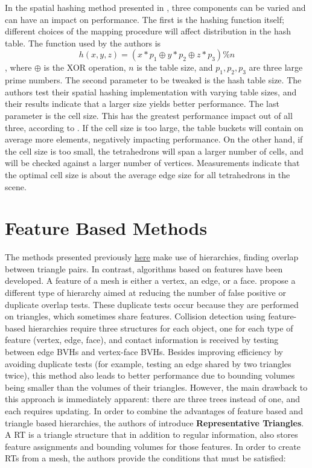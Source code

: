 
In the spatial hashing method presented in \citep{thm03}, three components can be varied and can have an impact on performance. The first is the hashing function itself; different choices of the mapping procedure will affect distribution in the hash table. The function used by the authors is \[h(x, y, z) = (x * p_{1} \oplus y * p_{2} \oplus  z * p_{3}) \% n \], where $\oplus$ is the XOR operation, $n$ is the table size, and $p_{1}, p_{2}, p_{3}$ are three large prime numbers. The second parameter to be tweaked is the hash table size. The authors test their spatial hashing implementation with varying table sizes, and their results indicate that a larger size yields better performance. The last parameter is the cell size. This has the greatest performance impact out of all three, according to \citep{thm03}. If the cell size is too large, the table buckets will contain on average more elements, negatively impacting performance. On the other hand, if the cell size is too small, the tetrahedrons will span a larger number of cells, and will be checked against a larger number of vertices. Measurements indicate that the optimal cell size is about the average edge size for all tetrahedrons in the scene.


\FloatBarrier
\section{Feature Based Methods}
\label{sec:feature}

The methods presented previously \hyperref[sec:bvh]{here} make use of hierarchies, finding overlap between triangle pairs. In contrast, algorithms based on features have been developed. A feature of a mesh is either a vertex, an edge, or a face. \citep{curtis2008} propose a different type of hierarchy aimed at reducing the number of false positive or duplicate overlap tests. These duplicate tests occur because they are performed on triangles, which sometimes share features. Collision detection using feature-based hierarchies require three structures for each object, one for each type of feature (vertex, edge, face), and contact information is received by testing between edge BVHs and vertex-face BVHs. Besides improving efficiency by avoiding duplicate tests (for example, testing an edge shared by two triangles twice), this method also leads to better performance due to bounding volumes being smaller than the volumes of their triangles. However, the main drawback to this approach is immediately apparent: there are three trees instead of one, and each requires updating. In order to combine the advantages of feature based and triangle based hierarchies, the authors of \citep{curtis2008} introduce \textbf{Representative Triangles}. A RT is a triangle structure that in addition to regular information, also stores feature assignments and bounding volumes for those features. In order to create RTs from a mesh, the authors provide the conditions that must be satisfied:

